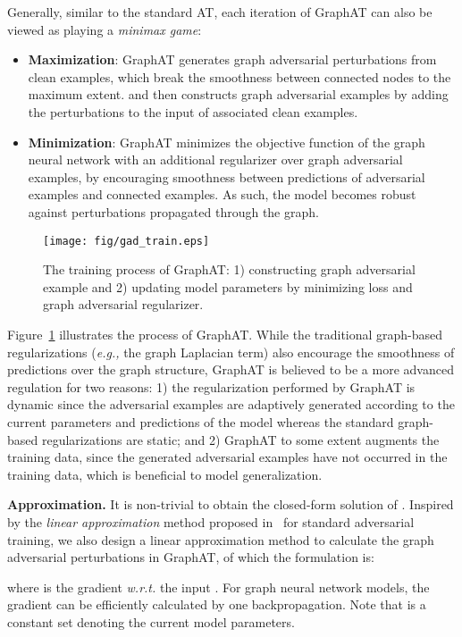 \documentclass[10pt,journal,compsoc]{IEEEtran}
\newcommand{\eg}{\emph{e.g., }}
\newcommand{\wrt}{\emph{w.r.t. }}
\begin{document}
Generally, similar to the standard AT, each iteration of GraphAT can also be viewed as playing a \textit{minimax game}:
\begin{itemize}[leftmargin=*]
	\item \textbf{Maximization}: GraphAT generates graph adversarial perturbations from clean examples, which break the smoothness between connected nodes to the maximum extent. and then constructs graph adversarial examples by adding the perturbations to the input of associated clean examples.
	\item \textbf{Minimization}: GraphAT minimizes the objective function of the graph neural network with an additional regularizer over graph adversarial examples, by encouraging smoothness between predictions of adversarial examples and connected examples. As such, the model becomes robust against perturbations propagated through the graph.
\end{itemize}
\begin{figure}[]
	\centering
	\texttt{[image: fig/gad\_train.eps]} 
	\vspace{-0.2cm}
	\caption{The training process of GraphAT: 1) constructing graph adversarial example and 2) updating model parameters by minimizing loss and graph adversarial regularizer.}
\label{fig:graph_train}
\end{figure}
Figure~\ref{fig:graph_train} illustrates the process of GraphAT. While the traditional graph-based regularizations (\eg the graph Laplacian term) also encourage the smoothness of predictions over the graph structure, GraphAT is believed to be a more advanced regulation for two reasons: 1) the regularization performed by GraphAT is dynamic since the adversarial examples are adaptively generated according to the current parameters and predictions of the model whereas the standard graph-based regularizations are static; and 2) GraphAT to some extent augments the training data, since the generated adversarial examples have not occurred in the training data, which is beneficial to model generalization.



\textbf{Approximation.} It is non-trivial to obtain the closed-form solution of . Inspired by the \textit{linear approximation} method proposed in~\cite{goodfellow2015explaining} for standard adversarial training, we also design a linear approximation method to calculate the graph adversarial perturbations in GraphAT, of which the formulation is:

where  is the gradient \wrt the input . For graph neural network models, the gradient can be efficiently calculated by one backpropagation. Note that  is a constant set denoting the current model parameters.
\end{document}
